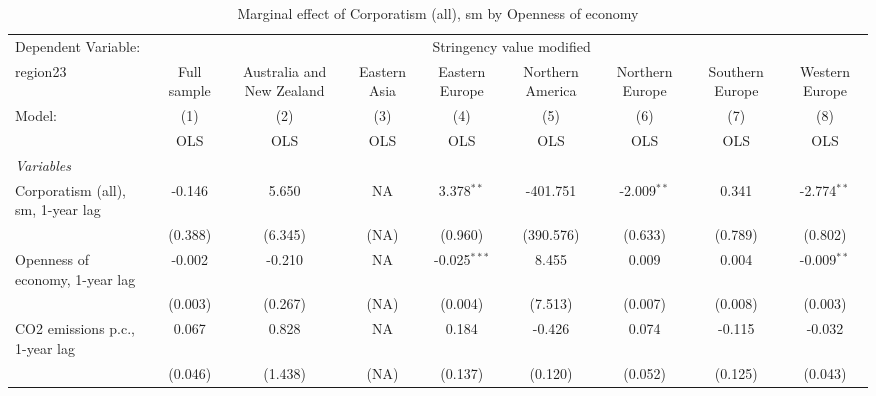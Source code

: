
\begin{table}[htbp]
   \caption{Marginal effect of Corporatism (all), sm by Openness of economy}
   \centering
   \begin{tabular}{lcccccccc}
      \toprule
      Dependent Variable: & \multicolumn{8}{c}{Stringency value modified}\\
      region23                                                            & Full sample   & Australia and New Zealand & Eastern Asia & Eastern Europe & Northern America & Northern Europe & Southern Europe & Western Europe \\   
      Model:                                                              & (1)           & (2)                       & (3)          & (4)            & (5)              & (6)             & (7)             & (8)\\  
                                                                          &  OLS          & OLS                       & OLS          & OLS            & OLS              & OLS             & OLS             & OLS\\  
      \midrule
      \emph{Variables}\\
      Corporatism (all), sm, 1-year lag                                   & -0.146        & 5.650                     & NA           & 3.378$^{**}$   & -401.751         & -2.009$^{**}$   & 0.341           & -2.774$^{**}$\\   
                                                                          & (0.388)       & (6.345)                   & (NA)         & (0.960)        & (390.576)        & (0.633)         & (0.789)         & (0.802)\\   
      Openness of economy, 1-year lag                                     & -0.002        & -0.210                    & NA           & -0.025$^{***}$ & 8.455            & 0.009           & 0.004           & -0.009$^{**}$\\   
                                                                          & (0.003)       & (0.267)                   & (NA)         & (0.004)        & (7.513)          & (0.007)         & (0.008)         & (0.003)\\   
      CO2 emissions p.c., 1-year lag                                      & 0.067         & 0.828                     & NA           & 0.184          & -0.426           & 0.074           & -0.115          & -0.032\\   
                                                                          & (0.046)       & (1.438)                   & (NA)         & (0.137)        & (0.120)          & (0.052)         & (0.125)         & (0.043)\\   

\end{tabular}
\end{table}
